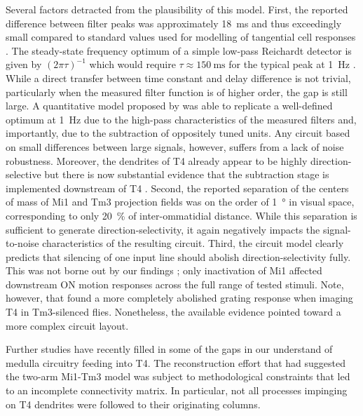 Several factors detracted from the plausibility of this model. First, the reported difference between filter peaks was approximately \SI{18}{\milli\second} and thus exceedingly small compared to standard values used for modelling of tangential cell responses \citep{Behnia:2014jh}. The steady-state frequency optimum of a simple low-pass Reichardt detector is given by $(2 \pi \tau)^{-1}$ which would require $\tau \approx \SI{150}{\milli\second}$ for the typical peak at \SI{1}{\hertz} \citep{Maisak:2013kk}. While a direct transfer between time constant and delay difference is not trivial, particularly when the measured filter function is of higher order, the gap is still large. A quantitative model proposed by \citet{Behnia:2014jh} was able to replicate a well-defined optimum at \SI{1}{\hertz} due to the high-pass characteristics of the measured filters and, importantly, due to the subtraction of oppositely tuned units. Any circuit based on small differences between large signals, however, suffers from a lack of noise robustness. Moreover, the dendrites of T4 already appear to be highly direction-selective \citep{Maisak:2013kk} but there is now substantial evidence that the subtraction stage is implemented downstream of T4 \citep[see][and the sections below]{Mauss:2015kj}. Second, the reported separation of the centers of mass of Mi1 and Tm3 projection fields was on the order of \SI{1}{\degree} in visual space, corresponding to only \SI{20}{\percent} of inter-ommatidial distance. While this separation is sufficient to generate direction-selectivity, it again negatively impacts the signal-to-noise characteristics of the resulting circuit. Third, the circuit model clearly predicts that silencing of one input line should abolish direction-selectivity fully. This was not borne out by our findings \citep{Ammer:2015jo}; only inactivation of Mi1 affected downstream ON motion responses across the full range of tested stimuli. Note, however, that \citet{Strother:2017aa} found a more completely abolished grating response when imaging T4 in Tm3-silenced flies. Nonetheless, the available evidence pointed toward a more complex circuit layout.

Further studies have recently filled in some of the gaps in our understand of medulla circuitry feeding into T4. The reconstruction effort that had suggested the two-arm Mi1-Tm3 model was subject to methodological constraints that led to an incomplete connectivity matrix. In particular, not all processes impinging on T4 dendrites were followed to their originating columns.

